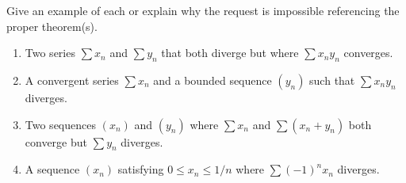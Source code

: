\documentclass{lew98_solutions}
\begin{document}
\begin{exercise}
\label{ex:2.7.4}
    Give an example of each or explain why the request is impossible referencing the proper theorem(s).
    \begin{enumerate}
        \item Two series \( \sum x_n \) and \( \sum y_n \) that both diverge but where \( \sum x_n y_n \) converges.

        \item A convergent series \( \sum x_n \) and a bounded sequence \( (y_n) \) such that \( \sum x_n y_n \) diverges.

        \item Two sequences \( (x_n) \) and \( (y_n) \) where \( \sum x_n \) and \( \sum (x_n + y_n) \) both converge but \( \sum y_n \) diverges.

        \item A sequence \( (x_n) \) satisfying \( 0 \leq x_n \leq 1/n \) where \( \sum (-1)^n x_n \) diverges.
    \end{enumerate}
\end{exercise}
\end{document}
